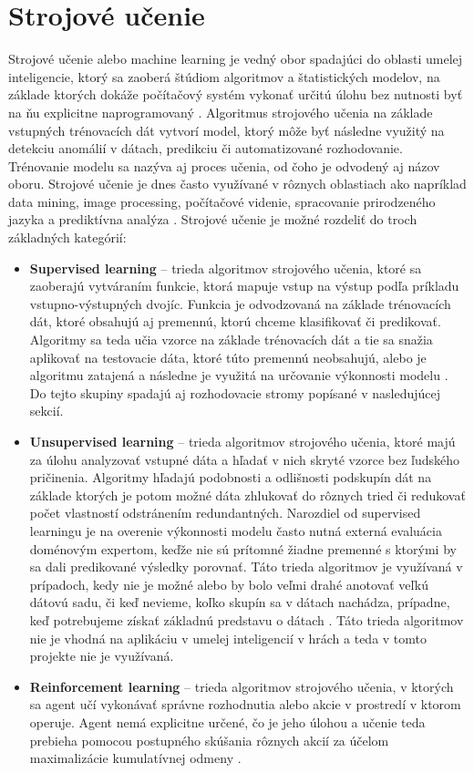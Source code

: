 \documentclass[slovak, master]{diploma}
\begin{document}
\chapter{Strojové učenie}
\label{sec:MachineLearningOverview}
Strojové učenie alebo machine learning je vedný obor spadajúci do oblasti umelej inteligencie, ktorý sa zaoberá štúdiom algoritmov a štatistických modelov, na základe ktorých dokáže počítačový systém vykonať určitú úlohu bez nutnosti byť na ňu explicitne naprogramovaný \cite{mahesh2020machine}. Algoritmus strojového učenia na základe vstupných trénovacích dát vytvorí model, ktorý môže byť následne využitý na detekciu anomálií v dátach, predikciu či automatizované rozhodovanie. Trénovanie modelu sa nazýva aj proces učenia, od čoho je odvodený aj názov oboru. Strojové učenie je dnes často využívané v rôznych oblastiach ako napríklad data mining, image processing, počítačové videnie, spracovanie prirodzeného jazyka a prediktívna analýza \cite{zhou2021machine}.
Strojové učenie je možné rozdeliť do troch základných kategórií:
\begin{itemize}
  \item \textbf{Supervised learning} -- trieda algoritmov strojového učenia, ktoré sa zaoberajú vytváraním funkcie, ktorá mapuje vstup na výstup podľa príkladu vstupno-výstupných dvojíc. Funkcia je odvodzovaná na základe trénovacích dát, ktoré obsahujú aj premennú, ktorú chceme klasifikovať či predikovať. Algoritmy sa teda učia vzorce na základe trénovacích dát a tie sa snažia aplikovať na testovacie dáta, ktoré túto premennú neobsahujú, alebo je algoritmu zatajená a následne je využitá na určovanie výkonnosti modelu \cite{mahesh2020machine}. Do tejto skupiny spadajú aj rozhodovacie stromy popísané v nasledujúcej sekcií.
  \item \textbf{Unsupervised learning} -- trieda algoritmov strojového učenia, ktoré majú za úlohu analyzovať vstupné dáta a hľadať v nich skryté vzorce bez ľudského pričinenia. Algoritmy hľadajú podobnosti a odlišnosti podskupín dát na základe ktorých je potom možné dáta zhlukovať do rôznych tried či redukovať počet vlastností odstránením redundantných. Narozdiel od supervised learningu je na overenie výkonnosti modelu často nutná externá evaluácia doménovým expertom, keďže nie sú prítomné žiadne premenné s ktorými by sa dali predikované výsledky porovnať. Táto trieda algoritmov je využívaná v prípadoch, kedy nie je možné alebo by bolo veľmi drahé anotovať veľkú dátovú sadu, či keď nevieme, koľko skupín sa v dátach nachádza, prípadne, keď potrebujeme získať základnú predstavu o dátach \cite{Unsupervised}. Táto trieda algoritmov nie je vhodná na aplikáciu v umelej inteligencií v hrách a teda v tomto projekte nie je využívaná.
  \item \textbf{Reinforcement learning} -- trieda algoritmov strojového učenia, v ktorých sa agent učí vykonávať správne rozhodnutia alebo akcie v prostredí v ktorom operuje. Agent nemá explicitne určené, čo je jeho úlohou a učenie teda prebieha pomocou postupného skúšania rôznych akcií za účelom maximalizácie kumulatívnej odmeny \cite{reinforcementLearning}.
\end{itemize}
\end{document}
